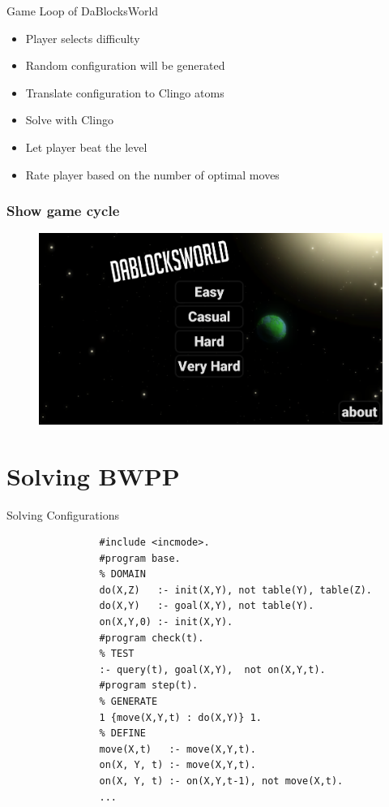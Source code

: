 \documentclass[12pt]{beamer}
\begin{document}
        \begin{frame}[fragile]{Game Loop of DaBlocksWorld}
            \begin{itemize}
                \item Player selects difficulty
                \item Random configuration will be generated
                \item Translate configuration to Clingo atoms
                \item Solve with Clingo
                \item Let player beat the level
                \item Rate player based on the number of optimal moves
            \end{itemize}
        \end{frame}

        \begin{frame}[fragile]
            \frametitle{Show game cycle}
            \begin{figure}
                \centering
                \includegraphics[width=\linewidth]{titleScreen.png}
                \label{titleScreen}
            \end{figure}
        \end{frame}

    \section{Solving BWPP}
        \begin{frame}[fragile]{Solving Configurations}
            \tiny
            \begin{lstlisting}
                #include <incmode>.
                #program base.
                % DOMAIN
                do(X,Z)   :- init(X,Y), not table(Y), table(Z).
                do(X,Y)   :- goal(X,Y), not table(Y).
                on(X,Y,0) :- init(X,Y).
                #program check(t).
                % TEST
                :- query(t), goal(X,Y),  not on(X,Y,t).
                #program step(t).
                % GENERATE
                1 {move(X,Y,t) : do(X,Y)} 1.
                % DEFINE
                move(X,t)   :- move(X,Y,t).
                on(X, Y, t) :- move(X,Y,t).
                on(X, Y, t) :- on(X,Y,t-1), not move(X,t).
                ...
            \end{lstlisting}
        \end{frame}
       
\end{document}
